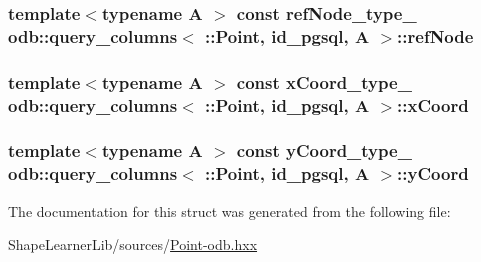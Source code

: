 \subsubsection[{ref\+Node}]{\setlength{\rightskip}{0pt plus 5cm}template$<$typename A $>$ const ref\+Node\+\_\+type\+\_\+ odb\+::query\+\_\+columns$<$ \+::{\bf Point}, id\+\_\+pgsql, A $>$\+::ref\+Node\hspace{0.3cm}{\ttfamily [static]}}\label{structodb_1_1query__columns_3_01_1_1_point_00_01id__pgsql_00_01_a_01_4_ac4887031a91c31299df7bbd5c2fcc82b}
\hypertarget{structodb_1_1query__columns_3_01_1_1_point_00_01id__pgsql_00_01_a_01_4_a800b6844444c836a892f35f9b38b5051}{}
\subsubsection[{x\+Coord}]{\setlength{\rightskip}{0pt plus 5cm}template$<$typename A $>$ const {\bf x\+Coord\+\_\+type\+\_\+} odb\+::query\+\_\+columns$<$ \+::{\bf Point}, id\+\_\+pgsql, A $>$\+::x\+Coord\hspace{0.3cm}{\ttfamily [static]}}\label{structodb_1_1query__columns_3_01_1_1_point_00_01id__pgsql_00_01_a_01_4_a800b6844444c836a892f35f9b38b5051}
\hypertarget{structodb_1_1query__columns_3_01_1_1_point_00_01id__pgsql_00_01_a_01_4_a97e8b4a26242a5e4515a13854ac6979d}{}
\subsubsection[{y\+Coord}]{\setlength{\rightskip}{0pt plus 5cm}template$<$typename A $>$ const {\bf y\+Coord\+\_\+type\+\_\+} odb\+::query\+\_\+columns$<$ \+::{\bf Point}, id\+\_\+pgsql, A $>$\+::y\+Coord\hspace{0.3cm}{\ttfamily [static]}}\label{structodb_1_1query__columns_3_01_1_1_point_00_01id__pgsql_00_01_a_01_4_a97e8b4a26242a5e4515a13854ac6979d}


The documentation for this struct was generated from the following file\+:\begin{DoxyCompactItemize}
\item 
Shape\+Learner\+Lib/sources/\hyperlink{_point-odb_8hxx}{Point-\/odb.\+hxx}\end{DoxyCompactItemize}
